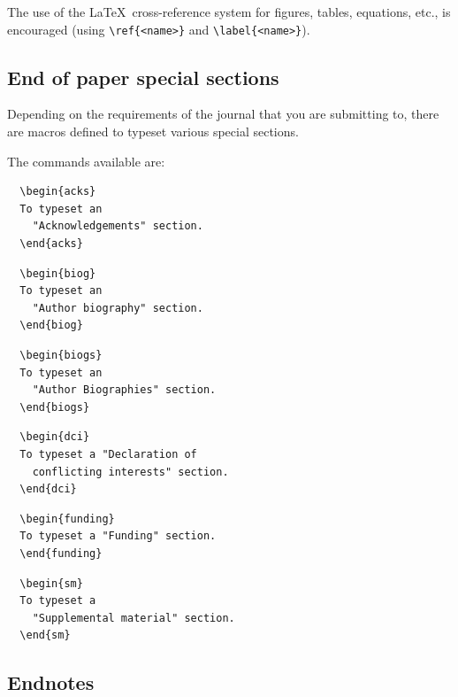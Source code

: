 \documentclass[Afour,sageh,times]{includes/tex/sagej}
\begin{document}
The use of the \LaTeX~cross-reference system for figures, tables,
equations, etc., is encouraged (using \verb"\ref{<name>}" and
\verb"\label{<name>}").

\subsection{End of paper special sections}

Depending on the requirements of the journal that you are submitting to,
there are macros defined to typeset various special sections.

The commands available are:

\begin{verbatim}
  \begin{acks}
  To typeset an
    "Acknowledgements" section.
  \end{acks}
\end{verbatim}

\begin{verbatim}
  \begin{biog}
  To typeset an
    "Author biography" section.
  \end{biog}
\end{verbatim}

\begin{verbatim}
  \begin{biogs}
  To typeset an
    "Author Biographies" section.
  \end{biogs}
\end{verbatim}

\begin{verbatim}
  \begin{dci}
  To typeset a "Declaration of
    conflicting interests" section.
  \end{dci}
\end{verbatim}

\begin{verbatim}
  \begin{funding}
  To typeset a "Funding" section.
  \end{funding}
\end{verbatim}

\begin{verbatim}
  \begin{sm}
  To typeset a
    "Supplemental material" section.
  \end{sm}
\end{verbatim}

\subsection{Endnotes}
\end{document}
